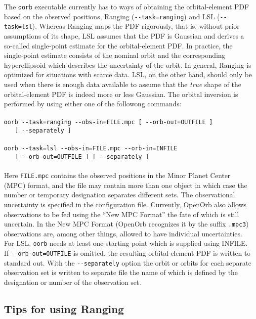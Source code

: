 \documentclass[12pt,english,twoside,a4paper]{report}
\begin{document}
The \verb|oorb| executable currently has to ways of obtaining the
orbital-element PDF based on the observed positions, Ranging
(\verb|--task=ranging|) and LSL (\verb|--task=lsl|). Whereas Ranging
maps the PDF rigorously, that is, without prior assumptions of its
shape, LSL assumes that the PDF is Gaussian and derives a so-called
single-point estimate for the orbital-element PDF. In practice, the
single-point estimate consists of the nominal orbit and the
corresponding hyperellipsoid which describes the uncertainty of the
orbit. In general, Ranging is optimized for situations with scarce
data. LSL, on the other hand, should only be used when there is enough
data available to assume that the {\it true} shape of the
orbital-element PDF is indeed more or less Gaussian. The orbital
inversion is performed by using either one of the followong commands:
\\ \\
\verb|oorb --task=ranging --obs-in=FILE.mpc [ --orb-out=OUTFILE ]| \\
\verb|   [ --separately ]| \\ \\ 
\verb|oorb --task=lsl --obs-in=FILE.mpc --orb-in=INFILE|\\
\verb|   [ --orb-out=OUTFILE ] [ --separately ]| \\ \\ 
Here \verb|FILE.mpc| contains the observed positions in the Minor
Planet Center (MPC) format, and the file may contain more than one
object in which case the number or temporary designation separates
different sets. The observational uncertainty is specified in the
configuration file. Currently, OpenOrb also allows observations to be
fed using the ``New MPC Format'' the fate of which is still
uncertain. In the New MPC Format (OpenOrb recognizes it by the suffix
\verb|.mpc3|) observations are, among other things, allowed to have
individual uncertainties. For LSL, \verb|oorb| needs at least one
starting point which is supplied using INFILE. If
\verb|--orb-out=OUTFILE| is omitted, the resulting orbital-element PDF
is written to standard out. With the \verb|--separately| option the
orbit or orbits for each separate observation set is written to
separate file the name of which is defined by the designation or
number of the observation set.

\subsection{Tips for using Ranging}
\end{document}
